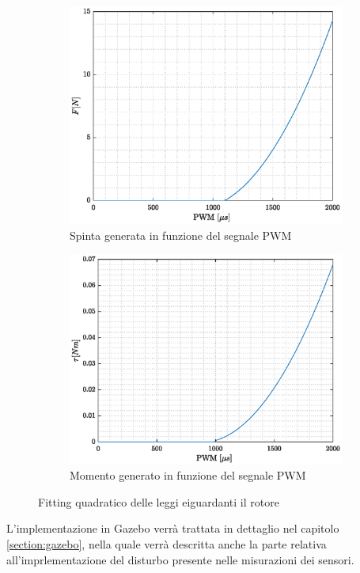 \begin{figure}
	\centering
	\begin{subfigure}{0.45\textwidth}
		\centering
		\includegraphics[width=1\textwidth]{SistemaQuadrirotore/Figure/ForzaPWM}
		\caption{Spinta generata in funzione del segnale PWM}
	\end{subfigure}
	\hfill
	\begin{subfigure}{0.45\textwidth}
		\centering
		\includegraphics[width=1\textwidth]{SistemaQuadrirotore/Figure/MomentoPWM}
		\caption{Momento generato in funzione del segnale PWM}
	\end{subfigure}
	\caption{Fitting quadratico delle leggi eiguardanti il rotore}
	\label{fig:pwmTM}
\end{figure}
 
L'implementazione in Gazebo verrà trattata in dettaglio nel capitolo \ref{section:gazebo}, nella quale verrà descritta anche la parte relativa all'imprlementazione del disturbo presente nelle misurazioni dei sensori.